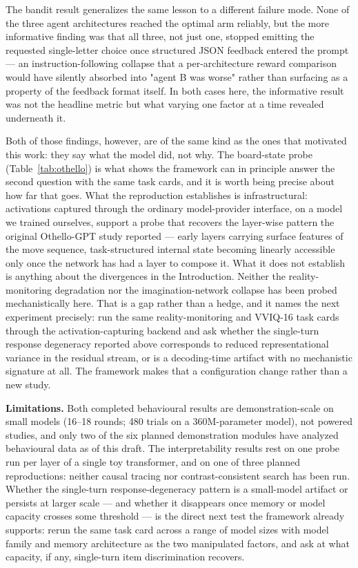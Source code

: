 \documentclass[pdflatex,sn-nature]{sn-jnl}
\begin{document}
The bandit result generalizes the same lesson to a different failure mode.
None of the three agent architectures reached the optimal arm reliably, but
the more informative finding was that all three, not just one, stopped
emitting the requested single-letter choice once structured JSON feedback
entered the prompt --- an instruction-following collapse that a
per-architecture reward comparison would have silently absorbed into
"agent B was worse" rather than surfacing as a property of the feedback
format itself. In both cases here, the informative result was not the
headline metric but what varying one factor at a time revealed underneath
it.

Both of those findings, however, are of the same kind as the ones that
motivated this work: they say what the model did, not why. The
board-state probe (Table~\ref{tab:othello}) is what shows the framework can
in principle answer the second question with the same task cards, and it is
worth being precise about how far that goes. What the reproduction
establishes is infrastructural: activations captured through the ordinary
model-provider interface, on a model we trained ourselves, support a probe
that recovers the layer-wise pattern the original Othello-GPT study
reported \citep{li2023othello} — early layers carrying surface features of
the move sequence, task-structured internal state becoming linearly
accessible only once the network has had a layer to compose it. What it
does not establish is anything about the divergences in the Introduction.
Neither the reality-monitoring degradation \citep{ranjan2026reality} nor
the imagination-network collapse \citep{ranjan2025psychological} has been
probed mechanistically here. That is a gap rather than a hedge, and it
names the next experiment precisely: run the same reality-monitoring and
VVIQ-16 task cards through the activation-capturing backend and ask whether
the single-turn response degeneracy reported above corresponds to reduced
representational variance in the residual stream, or is a decoding-time
artifact with no mechanistic signature at all. The framework makes that a
configuration change rather than a new study.

\textbf{Limitations.} Both completed behavioural results are
demonstration-scale on small models (16--18 rounds; 480 trials on a
360M-parameter model), not powered studies, and only two of the six planned
demonstration modules have analyzed behavioural data as of this draft. The
interpretability results rest on one probe run per layer of a single toy
transformer, and on one of three planned reproductions: neither causal
tracing \citep{meng2022rome} nor contrast-consistent search
\citep{burns2023ccs} has been run. Whether the single-turn
response-degeneracy pattern is a small-model artifact or persists at
larger scale --- and whether it disappears once memory or model capacity
crosses some threshold --- is the direct next test the framework already
supports: rerun the same task card across a range of model sizes with
model family and memory architecture as the two manipulated factors, and
ask at what capacity, if any, single-turn item discrimination recovers.
\end{document}
